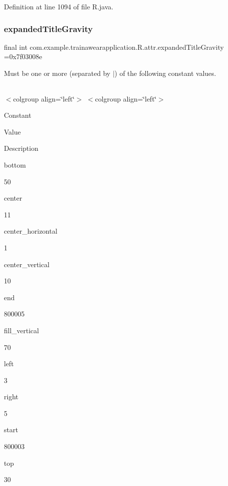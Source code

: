 Definition at line 1094 of file R.\+java.

\mbox{\label{classcom_1_1example_1_1trainawearapplication_1_1_r_1_1attr_a230a48748ba05699bc034fe4b256a0a1}} 
\subsubsection{\texorpdfstring{expandedTitleGravity}{expandedTitleGravity}}
{\footnotesize\ttfamily final int com.\+example.\+trainawearapplication.\+R.\+attr.\+expanded\+Title\+Gravity =0x7f03008e\hspace{0.3cm}{\ttfamily [static]}}

Must be one or more (separated by \textquotesingle{}$\vert$\textquotesingle{}) of the following constant values.

\tabulinesep=1mm
\begin{longtabu}spread 0pt [c]{*{0}{|X[-1]}|}
\hline
\end{longtabu}
$<$colgroup align=\char`\"{}left\char`\"{}$>$ $<$colgroup align=\char`\"{}left\char`\"{}$>$ 

Constant

Value

Description 

bottom

50

center

11

center\+\_\+horizontal

1

center\+\_\+vertical

10

end

800005

fill\+\_\+vertical

70

left

3

right

5

start

800003

top

30

